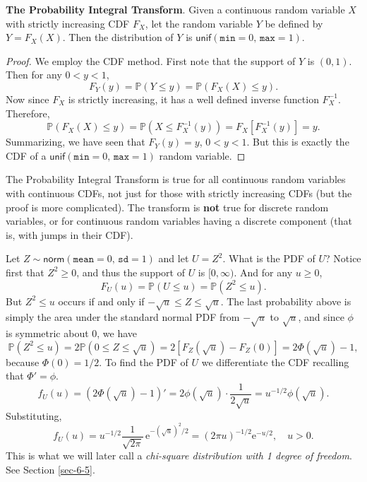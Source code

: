 \textbf{The Probability Integral Transform}. Given a continuous random
variable \(X\) with strictly increasing CDF \(F_{X}\), let the random
variable \(Y\) be defined by \(Y=F_{X}(X)\). Then the distribution of
\(Y\) is \(\mathsf{unif}(\mathtt{min}=0,\,\mathtt{max}=1)\).


\begin{proof}
We employ the CDF method. First note that the support of \(Y\) is
\((0,1)\). Then for any \(0<y<1\), \[ F_{Y}(y)=\mathbb{P}(Y\leq
y)=\mathbb{P}(F_{X}(X)\leq y).  \] Now since \(F_{X}\) is strictly
increasing, it has a well defined inverse function
\(F_{X}^{-1}\). Therefore, \[ \mathbb{P}(F_{X}(X)\leq
y)=\mathbb{P}(X\leq F_{X}^{-1}(y))=F_{X}[F_{X}^{-1}(y)]=y.  \]
Summarizing, we have seen that \(F_{Y}(y)=y\), \(0<y<1\). But this is
exactly the CDF of a
\(\mathsf{unif}(\mathtt{min}=0,\,\mathtt{max}=1)\) random variable.
\end{proof}

\begin{fact}
The Probability Integral Transform is true for all continuous random
variables with continuous CDFs, not just for those with strictly
increasing CDFs (but the proof is more complicated). The transform is
\textbf{not} true for discrete random variables, or for continuous random
variables having a discrete component (that is, with jumps in their
CDF).
\end{fact}

\label{exa-distn-of-z-squared} Let
\(Z\sim\mathsf{norm}(\mathtt{mean}=0,\,\mathtt{sd}=1)\) and let
\(U=Z^{2}\). What is the PDF of \(U\)?  Notice first that
\(Z^{2}\geq0\), and thus the support of \(U\) is \([0,\infty)\). And
for any \(u\geq0\), \[ F_{U}(u)=\mathbb{P}(U\leq
u)=\mathbb{P}(Z^{2}\leq u).  \] But \(Z^{2}\leq u\) occurs if and only
if \(-\sqrt{u}\leq Z\leq\sqrt{u}\). The last probability above is
simply the area under the standard normal PDF from \(-\sqrt{u}\) to
\(\sqrt{u}\), and since \(\phi\) is symmetric about 0, we have \[
\mathbb{P}(Z^{2}\leq u)=2\mathbb{P}(0\leq
Z\leq\sqrt{u})=2\left[F_{Z}(\sqrt{u})-F_{Z}(0)\right]=2\Phi(\sqrt{u})-1,
\] because \(\Phi(0)=1/2\). To find the PDF of \(U\) we differentiate
the CDF recalling that \(\Phi'= \phi\).  \[
f_{U}(u)=\left(2\Phi(\sqrt{u})-1\right)'=2\phi(\sqrt{u})\cdot\frac{1}{2\sqrt{u}}=u^{-1/2}\phi(\sqrt{u}).
\] Substituting, \[ f_{U}(u) =
u^{-1/2}\frac{1}{\sqrt{2\pi}}\,\mathrm{e}^{-(\sqrt{u})^{2}/2}=(2\pi
u)^{-1/2}\mathrm{e}^{-u/2},\quad u > 0.  \] This is what we will later
call a \emph{chi-square distribution with 1 degree of freedom}. See Section
\ref{sec-6-5}.

